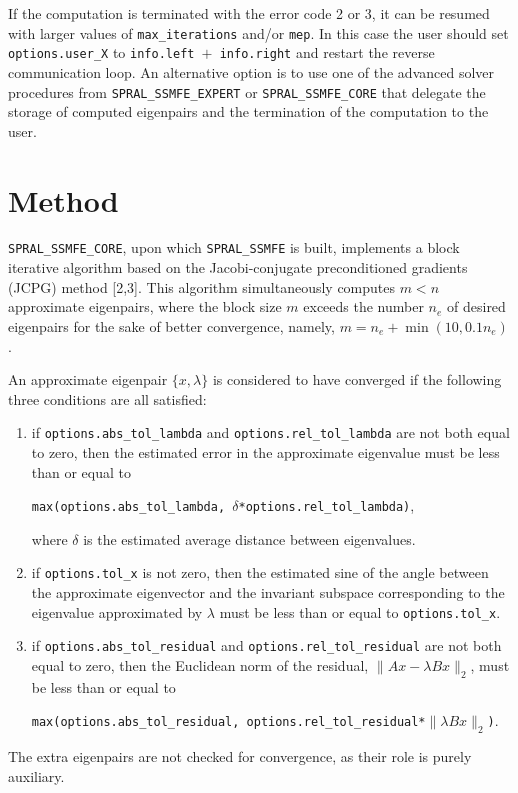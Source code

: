 If the computation is terminated with the error code 2 or 3,
it can be resumed with larger values of {\tt max\_iterations} and/or {\tt mep}.
In this case the user should set {\tt options.user\_X} to
{\tt info.left $+$ info.right}
and restart the reverse communication loop.
An alternative option is to use
one of the advanced solver procedures
from \texttt{SPRAL\_SSMFE\_EXPERT} or \texttt{SPRAL\_SSMFE\_CORE}
that delegate the storage of computed eigenpairs and
the termination of the computation to the user.

\section{Method}
\label{ssmfe:method}

\texttt{SPRAL\_SSMFE\_CORE}, upon which \texttt{SPRAL\_SSMFE} is built,
implements a block iterative algorithm
based on the Jacobi-conjugate preconditioned gradients (JCPG) method [2,3].
This algorithm simultaneously computes $m < n$ approximate eigenpairs,
where the block size $m$ exceeds the number $n_e$ of desired eigenpairs
for the sake of better convergence, namely,
$m = n_e + \min(10, 0.1 n_e)$.

An approximate eigenpair 
$\{x,\lambda\}$ is considered to have converged
if %
the following three conditions are all satisfied:
%
\begin{enumerate}
%
\item
if {\tt options.abs\_tol\_lambda} and 
{\tt options.rel\_tol\_lambda}
are not both equal to zero, then
the estimated error in the approximate eigenvalue
must be less than or equal to

{\tt max(options.abs\_tol\_lambda, 
$\delta$*options.rel\_tol\_lambda)},

where $\delta$ is the estimated average distance
between eigenvalues.
\item
if {\tt options.tol\_x} is not zero, then
the estimated sine of the angle between
the approximate eigenvector and the invariant subspace
corresponding to the eigenvalue 
approximated by $\lambda$
must be less than or equal to {\tt options.tol\_x}.
%
\item
if {\tt options.abs\_tol\_residual} and 
{\tt options.rel\_tol\_residual}
are not both equal to zero, then
the Euclidean norm of the residual,
$\|A x - \lambda B x\|_2$,
must be less than or equal to

{\tt max(options.abs\_tol\_residual, 
options.rel\_tol\_residual*$\|\lambda B x\|_2$)}.
%
\end{enumerate}
%
The extra eigenpairs are not checked for convergence,
as their role is purely auxiliary.

